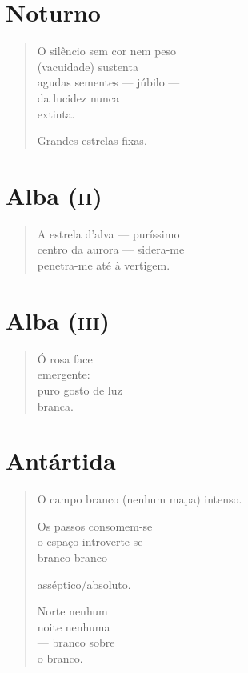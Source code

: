 \chapter{Noturno}

\begin{verse}
O silêncio sem cor nem peso\\
(vacuidade) sustenta\\
agudas sementes --- júbilo ---\\
da lucidez nunca\\
\qquad\qquad extinta.

Grandes estrelas fixas.
\end{verse}

\chapter{Alba (\textsc{ii})}

\begin{verse}
A estrela d'alva --- puríssimo\\
centro da aurora --- sidera-me\\
penetra-me até à vertigem.
\end{verse}

\chapter{Alba (\textsc{iii})}

\begin{verse}
Ó rosa face\\
emergente:\\
puro gosto de luz\\
branca.
\end{verse}

\chapter{Antártida}

\begin{verse}
O campo branco (nenhum mapa) intenso.

Os passos consomem-se\\
o espaço introverte-se\\
branco branco

asséptico/absoluto.

Norte nenhum\\
noite nenhuma\\
--- branco sobre\\
\qquad\qquad\quad o branco.
\end{verse}

